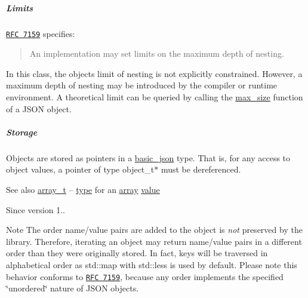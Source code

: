 \subparagraph*{Limits}

\href{http://rfc7159.net/rfc7159}{\tt R\+FC 7159} specifies\+: \begin{quote}
An implementation may set limits on the maximum depth of nesting. \end{quote}


In this class, the object\textquotesingle{}s limit of nesting is not explicitly constrained. However, a maximum depth of nesting may be introduced by the compiler or runtime environment. A theoretical limit can be queried by calling the \mbox{\hyperlink{classnlohmann_1_1basic__json_a2f47d3c6a441c57dd2be00449fbb88e1}{max\+\_\+size}} function of a J\+S\+ON object.

\subparagraph*{Storage}

Objects are stored as pointers in a \mbox{\hyperlink{classnlohmann_1_1basic__json}{basic\+\_\+json}} type. That is, for any access to object values, a pointer of type {\ttfamily object\+\_\+t$\ast$} must be dereferenced.

\begin{DoxySeeAlso}{See also}
\mbox{\hyperlink{classnlohmann_1_1basic__json_ae095578e03df97c5b3991787f1056374}{array\+\_\+t}} -- \mbox{\hyperlink{classnlohmann_1_1basic__json_a2b2d781d7f2a4ee41bc0016e931cadf7}{type}} for an \mbox{\hyperlink{classnlohmann_1_1basic__json_a8a7d537fc297bbc5b845f92fe0445e3b}{array}} \mbox{\hyperlink{classnlohmann_1_1basic__json_adcf8ca5079f5db993820bf50036bf45d}{value}}
\end{DoxySeeAlso}
\begin{DoxySince}{Since}
version 1..
\end{DoxySince}
\begin{DoxyNote}{Note}
The order name/value pairs are added to the object is {\itshape not} preserved by the library. Therefore, iterating an object may return name/value pairs in a different order than they were originally stored. In fact, keys will be traversed in alphabetical order as {\ttfamily std\+::map} with {\ttfamily std\+::less} is used by default. Please note this behavior conforms to \href{http://rfc7159.net/rfc7159}{\tt R\+FC 7159}, because any order implements the specified \char`\"{}unordered\char`\"{} nature of J\+S\+ON objects. 
\end{DoxyNote}
\mbox{\label{classnlohmann_1_1basic__json_a3333a5a8714912adda33a35b369f7b3d}} 

